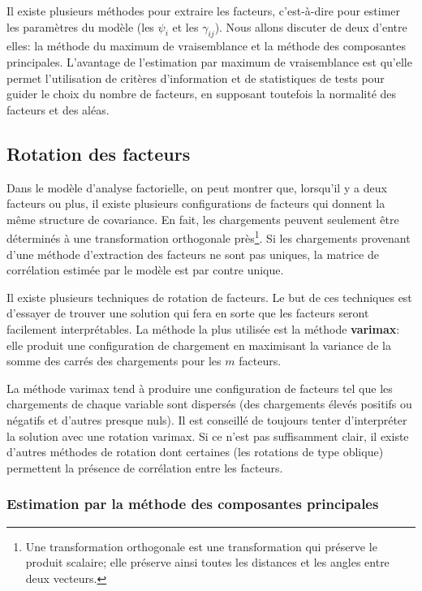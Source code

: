 \documentclass[
  11pt,
  letterpaper,
]{scrbook}
\theoremstyle{definition}
\theoremstyle{remark}
\begin{document}
Il existe plusieurs méthodes pour extraire les facteurs, c'est-à-dire
pour estimer les paramètres du modèle (les \(\psi_i\) et les
\(\gamma_{ij}\)). Nous allons discuter de deux d'entre elles: la méthode
du maximum de vraisemblance et la méthode des composantes principales.
L'avantage de l'estimation par maximum de vraisemblance est qu'elle
permet l'utilisation de critères d'information et de statistiques de
tests pour guider le choix du nombre de facteurs, en supposant toutefois
la normalité des facteurs et des aléas.

\subsection{Rotation des facteurs}\label{rotation-des-facteurs}

Dans le modèle d'analyse factorielle, on peut montrer que, lorsqu'il y a
deux facteurs ou plus, il existe plusieurs configurations de facteurs
qui donnent la même structure de covariance. En fait, les chargements
peuvent seulement être déterminés à une transformation orthogonale
près\footnote{Une transformation orthogonale est une transformation qui
  préserve le produit scalaire; elle préserve ainsi toutes les distances
  et les angles entre deux vecteurs.}. Si les chargements provenant
d'une méthode d'extraction des facteurs ne sont pas uniques, la matrice
de corrélation estimée par le modèle est par contre unique.

Il existe plusieurs techniques de rotation de facteurs. Le but de ces
techniques est d'essayer de trouver une solution qui fera en sorte que
les facteurs seront facilement interprétables. La méthode la plus
utilisée est la méthode \textbf{varimax}: elle produit une configuration
de chargement en maximisant la variance de la somme des carrés des
chargements pour les \(m\) facteurs.

La méthode varimax tend à produire une configuration de facteurs tel que
les chargements de chaque variable sont dispersés (des chargements
élevés positifs ou négatifs et d'autres presque nuls). Il est conseillé
de toujours tenter d'interpréter la solution avec une rotation varimax.
Si ce n'est pas suffisamment clair, il existe d'autres méthodes de
rotation dont certaines (les rotations de type oblique) permettent la
présence de corrélation entre les facteurs.

\subsubsection{Estimation par la méthode des composantes
principales}\label{estimation-par-la-muxe9thode-des-composantes-principales}
\end{document}
